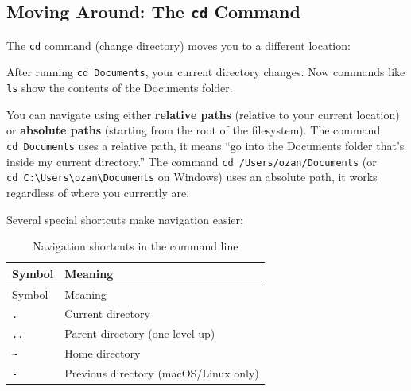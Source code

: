 \documentclass[
  letterpaper,
  DIV=11,
  numbers=noendperiod]{scrreprt}
\newenvironment{Shaded}{\begin{snugshade}}{\end{snugshade}}
\newcommand{\ExtensionTok}[1]{\textcolor[rgb]{0.00,0.23,0.31}{#1}}
\newcommand{\NormalTok}[1]{\textcolor[rgb]{0.00,0.23,0.31}{#1}}
\begin{document}
\subsection{\texorpdfstring{Moving Around: The \texttt{cd}
Command}{Moving Around: The cd Command}}\label{moving-around-the-cd-command}

The \texttt{cd} command (change directory) moves you to a different
location:

\begin{codelisting}

\caption{\texttt{terminal}}

\begin{Shaded}
\end{Shaded}

\end{codelisting}

After running \texttt{cd\ Documents}, your current directory changes.
Now commands like \texttt{ls} show the contents of the Documents folder.

You can navigate using either \textbf{relative paths} (relative to your
current location) or \textbf{absolute paths} (starting from the root of
the filesystem). The command \texttt{cd\ Documents} uses a relative
path, it means ``go into the Documents folder that's inside my current
directory.'' The command \texttt{cd\ /Users/ozan/Documents} (or
\texttt{cd\ C:\textbackslash{}Users\textbackslash{}ozan\textbackslash{}Documents}
on Windows) uses an absolute path, it works regardless of where you
currently are.

Several special shortcuts make navigation easier:

\begin{longtable}[]{@{}ll@{}}
\caption{Navigation shortcuts in the command
line}\label{tbl-nav-shortcuts}\tabularnewline
\toprule\noalign{}
Symbol & Meaning \\
\midrule\noalign{}
\endfirsthead
\toprule\noalign{}
Symbol & Meaning \\
\midrule\noalign{}
\endhead
\bottomrule\noalign{}
\endlastfoot
\texttt{.} & Current directory \\
\texttt{..} & Parent directory (one level up) \\
\texttt{\textasciitilde{}} & Home directory \\
\texttt{-} & Previous directory (macOS/Linux only) \\
\end{longtable}
\end{document}
